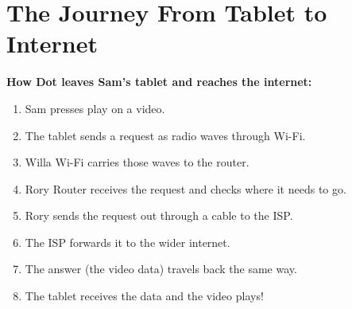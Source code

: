\sectionrule

\section*{The Journey From Tablet to Internet}

\begin{quickmap}
  \textbf{How Dot leaves Sam's tablet and reaches the internet:}
  \begin{enumerate}[label=\textbf{\arabic*.}]
    \item Sam presses play on a video.
    \item The tablet sends a request as radio waves through Wi-Fi.
    \item Willa Wi-Fi carries those waves to the router.
    \item Rory Router receives the request and checks where it needs to go.
    \item Rory sends the request out through a cable to the ISP.
    \item The ISP forwards it to the wider internet.
    \item The answer (the video data) travels back the same way.
    \item The tablet receives the data and the video plays!
  \end{enumerate}
\end{quickmap}

